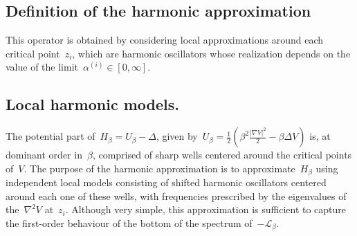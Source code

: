 \documentclass[10pt]{article}
\newcommand{\cL}{\mathcal{L}}
\newcommand{\R}{\mathbb{R}}
\newcommand{\1}{\mathbbm 1}
\newcommand{\epsLimit}[1]{\alpha^{(#1)}} %
\newtheorem{definition}{Definition}
\begin{document}
    \subsection{Definition of the harmonic approximation}
    This operator is obtained by considering local approximations around each critical point~$z_i$, which are harmonic oscillators whose realization depends on the value of the limit~$\epsLimit{i} \in [0,\infty]$.

    \subsection{Local harmonic models.\newline}\label{subsec:local_oscillators}
    The potential part of~$H_\beta = U_\beta - \Delta$, given by~$U_\beta=\frac12\left(\beta^2\frac{|\nabla V|^2}2-\beta\Delta V\right)$ is, at dominant order in~$\beta$, comprised of sharp wells centered around the critical points of~$V$. 
    The purpose of the harmonic approximation is to approximate~$H_\beta$ using independent local models consisting of shifted harmonic oscillators centered around each one of these wells, with frequencies prescribed by the eigenvalues of the~$\nabla^2 V$ at~$z_i$.
    Although very simple, this approximation is sufficient to capture the first-order behaviour of the bottom of the spectrum of~$-\cL_\beta$. 
\end{document}
